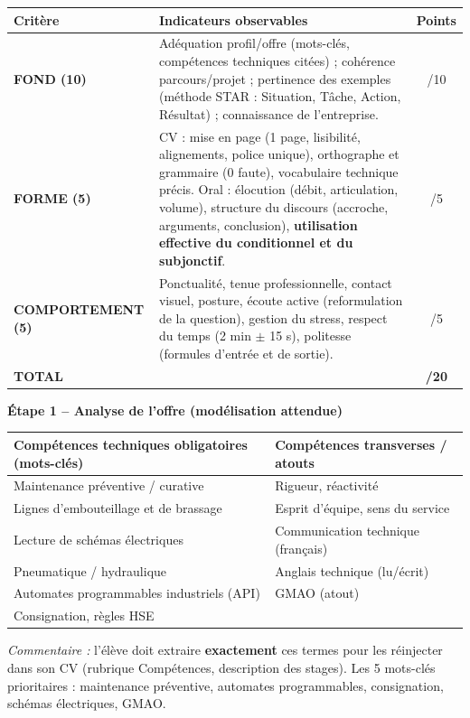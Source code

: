 \documentclass[11pt]{article}
\newcommand{\cle}[1]{{\popxbold\color{popdark}#1}}
\newcounter{popsec}
\newcounter{popsub}
\newcommand{\courssub}[1]{%
  \stepcounter{popsub}%
  \par\vspace{9pt}\noindent{\popxbold\fontsize{11.5}{13}\selectfont\color{popink}{\color{poporange}\thepopsec.\thepopsub}\hspace{6pt}#1}\par\nopagebreak\vspace{4pt}
}
\begin{document}
\begin{aretenir}
\begin{tabularx}{\linewidth}{|l|X|c|}
\hline
\textbf{Critère} & \textbf{Indicateurs observables} & \textbf{Points} \\
\hline
\textbf{FOND (10)} & Adéquation profil/offre (mots-clés, compétences techniques citées) ; cohérence parcours/projet ; pertinence des exemples (méthode STAR : Situation, Tâche, Action, Résultat) ; connaissance de l'entreprise. & /10 \\
\hline
\textbf{FORME (5)} & CV : mise en page (1 page, lisibilité, alignements, police unique), orthographe et grammaire (0 faute), vocabulaire technique précis. Oral : élocution (débit, articulation, volume), structure du discours (accroche, arguments, conclusion), \textbf{utilisation effective du conditionnel et du subjonctif}. & /5 \\
\hline
\textbf{COMPORTEMENT (5)} & Ponctualité, tenue professionnelle, contact visuel, posture, écoute active (reformulation de la question), gestion du stress, respect du temps (2 min $\pm$ 15 s), politesse (formules d'entrée et de sortie). & /5 \\
\hline
\textbf{TOTAL} & & \textbf{/20} \\
\hline
\end{tabularx}
\end{aretenir}

\courssub{Démarche et corrigé commenté}

\textbf{Étape 1 -- Analyse de l'offre (modélisation attendue)}
\begin{center}
\begin{tabularx}{\linewidth}{|X|X|}
\hline
\textbf{Compétences techniques obligatoires (mots-clés)} & \textbf{Compétences transverses / atouts} \\
\hline
Maintenance préventive / curative & Rigueur, réactivité \\
Lignes d'embouteillage et de brassage & Esprit d'équipe, sens du service \\
Lecture de schémas électriques & Communication technique (français) \\
Pneumatique / hydraulique & Anglais technique (lu/écrit) \\
Automates programmables industriels (API) & GMAO (atout) \\
Consignation, règles HSE & \\
\hline
\end{tabularx}
\end{center}
\emph{Commentaire :} l'élève doit extraire \textbf{exactement} ces termes pour les réinjecter dans son CV (rubrique Compétences, description des stages). Les 5 mots-clés prioritaires : \cle{maintenance préventive}, \cle{automates programmables}, \cle{consignation}, \cle{schémas électriques}, \cle{GMAO}.
\end{document}
